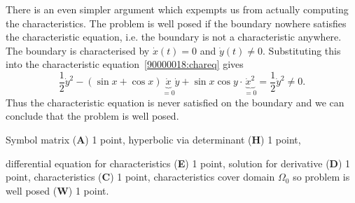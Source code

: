 \begin{diskussion}
There is an even simpler argument which expempts us from actually computing
the characteristics.
The problem is well posed if the boundary nowhere satisfies the characteristic
equation, i.e. the boundary is not a characteristic anywhere.
The boundary is characterised by $\dot{x}(t)=0$ and $\dot{y}(t)\ne 0$.
Substituting this into the characteristic equation~\eqref{90000018:chareq}
gives
\[
\frac12
\dot{y}^2 
-
(\sin x + \cos x) \underbrace{\dot{x}}_{=0}\dot{y}
+
\sin x \cos y \cdot \underbrace{\dot{x}^2}_{=0}
=
\frac12\dot{y}^2
\ne
0.
\]
Thus the characteristic equation is never satisfied on the boundary
and we can conclude that the problem is well posed.
\end{diskussion}

\begin{bewertung}
\begin{teilaufgaben}
\item
Symbol matrix ({\bf A}) 1 point,
hyperbolic via determinant ({\bf H}) 1 point,
\item
differential equation for characteristics ({\bf E}) 1 point,
solution for derivative ({\bf D}) 1 point,
characteristics ({\bf C}) 1 point,
characteristics cover domain $\Omega_0$ so problem is well posed ({\bf W})
1 point.
\end{teilaufgaben}
\end{bewertung}




